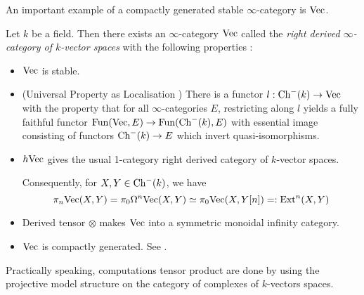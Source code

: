 \documentclass[./main.tex]{subfiles}
\begin{document}
  
An important example of a compactly generated stable $\infty$-category
is $\mathrm{Vec}$.

\begin{prop}
  
  Let $k$ be a field.
  Then there exists an $\infty$-category $\mathrm{Vec}$ called
  the \emph{right derived $\infty$-category of $k$-vector spaces} 
  with the following properties : 
  \begin{itemize}
    \item \cite[Prop 1.3.2.18]{Lurie-HA} $\mathrm{Vec}$ is stable. 
    \item (Universal Property as Localisation \cite[Prop 1.3.4.4]{Lurie-HA}) 
    There is a functor $l : \mathrm{Ch}^-(k) \to \mathrm{Vec}$
    with the property that for all $\infty$-categories $E$,
    restricting along $l$ yields a fully faithful functor
    $\mathrm{Fun}(\mathrm{Vec} , E) \to \mathrm{Fun}(\mathrm{Ch}^-(k) , E)$
    with essential image consisting of functors $\mathrm{Ch}^-(k) \to E$
    which invert quasi-isomorphisms.
    \item \cite[Prop 1.3.2.9]{Lurie-HA}
    $h\mathrm{Vec}$ gives the usual 1-category right derived category
    of $k$-vector spaces.
    
    Consequently, for $X, Y \in \mathrm{Ch}^-(k)$,
    we have \[
      \pi_n \mathrm{Vec}(X,Y) = \pi_0 \Omega^n \mathrm{Vec}(X,Y)
      \simeq \pi_0 \mathrm{Vec}(X , Y[n]) =: \mathrm{Ext}^n(X,Y)
    \]
    \item Derived tensor $\otimes$ makes $\mathrm{Vec}$ into a symmetric monoidal
    infinity category.

    \item $\mathrm{Vec}$ is compactly generated. See .
  \end{itemize}
\end{prop}
Practically speaking, 
computations tensor product are done by using the projective model structure 
on the category of complexes of $k$-vectors spaces.




\end{document}
